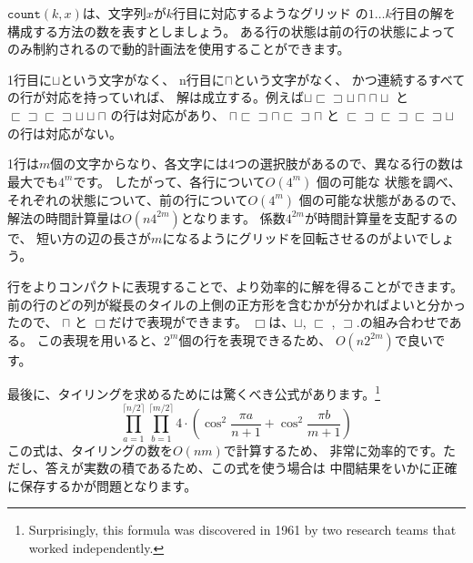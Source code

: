 $\texttt{count}(k,x)$は、文字列$x$が$k$行目に対応するようなグリッド
の$1 \ldots k$行目の解を構成する方法の数を表すとしましょう。
ある行の状態は前の行の状態によってのみ制約されるので動的計画法を使用することができます。

1行目に$\sqcup$という文字がなく、
n行目に$\sqcap$という文字がなく、
かつ連続するすべての行が対応を持っていれば、
解は成立する。例えば$\sqcup \sqsubset \sqsupset \sqcup \sqcap \sqcap \sqcup$ と
$\sqsubset \sqsupset \sqsubset \sqsupset \sqcup \sqcup \sqcap$ の行は対応があり、
$\sqcap \sqsubset \sqsupset \sqcap \sqsubset \sqsupset \sqcap$ と
$\sqsubset \sqsupset \sqsubset \sqsupset \sqsubset \sqsupset \sqcup$の行は対応がない。

1行は$m$個の文字からなり、各文字には4つの選択肢があるので、異なる行の数は最大でも$4^m$です。
したがって、各行について$O(4^m)$ 個の可能な 状態を調べ、
それぞれの状態について、前の行について$O(4^m)$  個の可能な状態があるので、
解法の時間計算量は$O(n 4^{2m})$となります。
係数$4^{2m}$が時間計算量を支配するので、
短い方の辺の長さが$m$になるようにグリッドを回転させるのがよいでしょう。

行をよりコンパクトに表現することで、より効率的に解を得ることができます。
前の行のどの列が縦長のタイルの上側の正方形を含むかが分かればよいと分かったので、
$\sqcap$ と $\Box$だけで表現ができます。
$\Box$は、$\sqcup$, $\sqsubset$ , $\sqsupset$.の組み合わせである。
この表現を用いると、$2^m$個の行を表現できるため、
$O(n 2^{2m})$で良いです。

最後に、タイリングを求めるためには驚くべき公式があります。\footnote{Surprisingly,
this formula was discovered in 1961 by two research teams \cite{kas61,tem61}
that worked independently.}
\[ \prod_{a=1}^{\lceil n/2 \rceil} \prod_{b=1}^{\lceil m/2 \rceil} 4 \cdot (\cos^2 \frac{\pi a}{n + 1} + \cos^2 \frac{\pi b}{m+1})\]
この式は、タイリングの数を$O(nm)$で計算するため、
非常に効率的です。ただし、答えが実数の積であるため、この式を使う場合は
中間結果をいかに正確に保存するかが問題となります。


